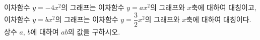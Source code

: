 이차함수 $y=-4x^2$의 그래프는 이차함수 $y=ax^2$의 그래프와 $x$축에 대하여 대칭이고, 이차함수 $y=bx^2$의 그래프는 이차함수 $y=\dfrac{3}{2}x^2$의 그래프와 $x$축에 대하여 대칭이다. 상수 $a$, $b$에 대하여 $ab$의 값을 구하시오.

